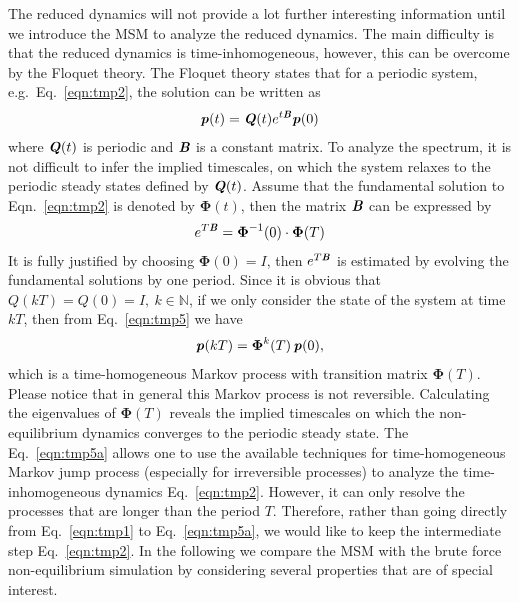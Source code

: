 \documentclass[aps, pre, preprint,unsortedaddress,a4paper,onecolumn]{revtex4}
\newcommand{\vect}[1]{\textbf{\textit{#1}}}
\begin{document}
The reduced dynamics will not provide a lot further interesting
information until we introduce the MSM to analyze the reduced dynamics. The main
difficulty is that the reduced dynamics is time-inhomogeneous, however, this can
be overcome by the Floquet theory.
The Floquet theory states that for a periodic system, e.g.~Eq.~\eqref{eqn:tmp2}, the solution can be written as
\begin{align}
  \label{eqn:tmp5}
  \vect p(t)  = \vect Q(t) e^{t\vect B} \vect p(0)
\end{align}
where $\vect Q(t)$ is periodic and $\vect B$ is a constant matrix.  To
analyze the spectrum, it is not difficult to infer the implied
timescales, on which the system relaxes to the periodic steady states
defined by $\vect Q(t)$.
Assume that the fundamental solution to Eqn.~\ref{eqn:tmp2} is denoted by $\boldsymbol \Phi(t)$, then
the matrix $\vect B$ can be expressed by
\begin{align}
  e^{T\vect B} = \boldsymbol \Phi^{-1}(0)\cdot \boldsymbol \Phi(T)
\end{align}
It is fully justified by choosing $ \boldsymbol \Phi(0) = I$, then
$e^{T\vect B}$ is estimated by evolving the fundamental solutions by
one period.
Since it is obvious that $Q(kT) = Q(0) = I,\ k\in\mathbb N$, if we only consider the state of the system
at time $kT$, then from Eq.~\eqref{eqn:tmp5} we have
\begin{align}
  \label{eqn:tmp5a}
  \vect p(kT)  = \boldsymbol\Phi^k(T) \,\vect p(0),
\end{align}
which is a time-homogeneous Markov process with transition matrix $\boldsymbol\Phi(T)$.
Please notice that in general this Markov process is not reversible.
Calculating the eigenvalues of $\boldsymbol\Phi(T)$ reveals the
implied timescales on which the non-equilibrium dynamics converges to
the periodic steady state.
The Eq.~\eqref{eqn:tmp5a} allows one to use the available techniques for time-homogeneous
Markov jump process (especially for irreversible processes)
to analyze the time-inhomogeneous dynamics Eq.~\eqref{eqn:tmp2}.
However, it can only resolve the processes that are longer than the period $T$.
Therefore, rather than going directly from Eq.~\eqref{eqn:tmp1} to Eq.~\eqref{eqn:tmp5a},
we would like to keep the intermediate step Eq.~\eqref{eqn:tmp2}.
In the following we compare the MSM with the brute force non-equilibrium simulation
by considering several properties that are of special interest.
\end{document}
